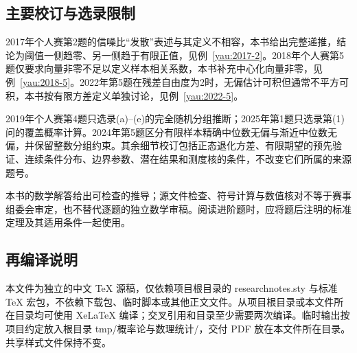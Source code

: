 \documentclass[UTF8,12pt,a4paper,fontset=fandol]{ctexbook}
\begin{document}
\subsection*{主要校订与选录限制}

2017年个人赛第2题的信噪比“发散”表述与其定义不相容，本书给出完整递推，结论为阈值一侧趋零、另一侧趋于有限正值，见例~\ref{yau:2017-2}。2018年个人赛第5题仅要求向量非零不足以定义样本相关系数，本书补充中心化向量非零，见例~\ref{yau:2018-5}。2022年第5题在残差自由度为2时，无偏估计可积但通常不平方可积，本书按有限方差定义单独讨论，见例~\ref{yau:2022-5}。

2019年个人赛第4题只选录(a)--(e)的完全随机分组推断；2025年第1题只选录第(1)问的覆盖概率计算。2024年第5题区分有限样本精确中位数无偏与渐近中位数无偏，并保留整数分组约束。其余细节校订包括正态退化方差、有限期望的预先验证、连续条件分布、边界参数、潜在结果和测度核的条件，不改变它们所属的来源题号。

本书的数学解答给出可检查的推导；源文件检查、符号计算与数值核对不等于赛事组委会审定，也不替代逐题的独立数学审稿。阅读进阶题时，应将题后注明的标准定理及其适用条件一起使用。

\subsection*{再编译说明}

本文件为独立的中文 TeX 源稿，仅依赖项目根目录的 researchnotes.sty 与标准 TeX 宏包，不依赖下载包、临时脚本或其他正文文件。从项目根目录或本文件所在目录均可使用 XeLaTeX 编译；交叉引用和目录至少需要两次编译。临时输出按项目约定放入根目录 tmp/概率论与数理统计/，交付 PDF 放在本文件所在目录。共享样式文件保持不变。
\end{document}
